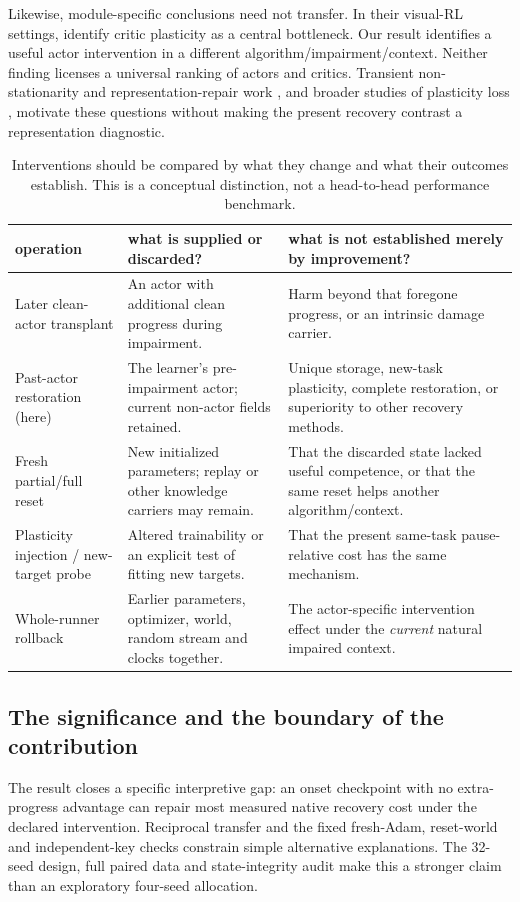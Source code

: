 Likewise, module-specific conclusions need not transfer. In their visual-RL settings, \citet{ma2024revisiting} identify critic plasticity as a central bottleneck. Our result identifies a useful actor intervention in a different algorithm/impairment/context. Neither finding licenses a universal ranking of actors and critics. Transient non-stationarity and representation-repair work \citep{igl2021transient}, and broader studies of plasticity loss \citep{dohare2024loss,klein2024survey}, motivate these questions without making the present recovery contrast a representation diagnostic.

\begin{table}[ht]
\centering
\caption{Interventions should be compared by what they change and what their outcomes establish. This is a conceptual distinction, not a head-to-head performance benchmark.}
\label{m:resetcomparison}
\small
\begin{tabularx}{\linewidth}{@{}>{\raggedright\arraybackslash}p{3.6cm}XX@{}}
\toprule
operation & what is supplied or discarded? & what is not established merely by improvement? \\
\midrule
Later clean-actor transplant & An actor with additional clean progress during impairment. & Harm beyond that foregone progress, or an intrinsic damage carrier. \\
Past-actor restoration (here) & The learner's pre-impairment actor; current non-actor fields retained. & Unique storage, new-task plasticity, complete restoration, or superiority to other recovery methods. \\
Fresh partial/full reset & New initialized parameters; replay or other knowledge carriers may remain. & That the discarded state lacked useful competence, or that the same reset helps another algorithm/context. \\
Plasticity injection / new-target probe & Altered trainability or an explicit test of fitting new targets. & That the present same-task pause-relative cost has the same mechanism. \\
Whole-runner rollback & Earlier parameters, optimizer, world, random stream and clocks together. & The actor-specific intervention effect under the \emph{current} natural impaired context. \\
\bottomrule
\end{tabularx}
\end{table}

\subsection{The significance and the boundary of the contribution}
The result closes a specific interpretive gap: an onset checkpoint with no extra-progress advantage can repair most measured native recovery cost under the declared intervention. Reciprocal transfer and the fixed fresh-Adam, reset-world and independent-key checks constrain simple alternative explanations. The 32-seed design, full paired data and state-integrity audit make this a stronger claim than an exploratory four-seed allocation.

